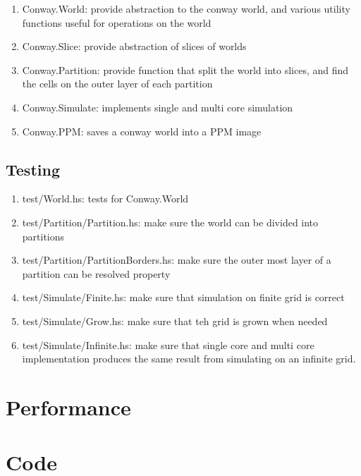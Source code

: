 \documentclass{article}
\newcommand{\code}[1]{{\ttfamily #1}}
\begin{document}
      \begin{enumerate}
        \item \code{Conway.World}: provide abstraction to the conway world,
        and various utility functions useful for operations on the world
        \item \code{Conway.Slice}: provide abstraction of slices of worlds
        \item \code{Conway.Partition}: provide function that split the world
        into slices, and find the cells on the outer layer of each partition
        \item \code{Conway.Simulate}: implements single and multi core
        simulation
        \item \code{Conway.PPM}: saves a conway world into a PPM image
      \end{enumerate}

    \subsection{Testing}

      \begin{enumerate}
        \item \code{test/World.hs}: tests for \code{Conway.World}
        \item \code{test/Partition/Partition.hs}: make sure the world can be
        divided into partitions
        \item \code{test/Partition/PartitionBorders.hs}: make sure the outer
        most layer of a partition can be resolved property
        \item \code{test/Simulate/Finite.hs}: make sure that simulation on
        finite grid is correct
        \item \code{test/Simulate/Grow.hs}: make sure that teh grid is grown
        when needed
        \item \code{test/Simulate/Infinite.hs}: make sure that single core
        and multi core implementation produces the same result from simulating
        on an infinite grid.
      \end{enumerate}

  \section{Performance}
  \section{Code}
\end{document}
